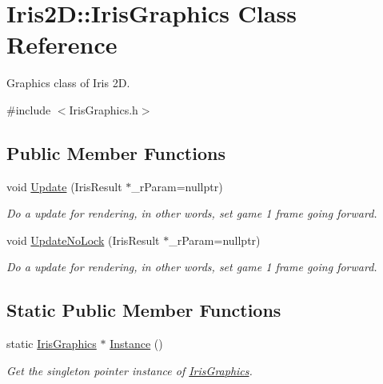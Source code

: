 \hypertarget{class_iris2_d_1_1_iris_graphics}{}\section{Iris2D\+:\+:Iris\+Graphics Class Reference}
\label{class_iris2_d_1_1_iris_graphics}


Graphics class of Iris 2D.  




{\ttfamily \#include $<$Iris\+Graphics.\+h$>$}

\subsection*{Public Member Functions}
\begin{DoxyCompactItemize}
\item 
void \hyperlink{class_iris2_d_1_1_iris_graphics_aa25debfc9a08d7084f48711a6bffdc4d}{Update} (Iris\+Result $\ast$\+\_\+r\+Param=nullptr)
\begin{DoxyCompactList}\small\item\em Do a update for rendering, in other words, set game 1 frame going forward. \end{DoxyCompactList}\item 
void \hyperlink{class_iris2_d_1_1_iris_graphics_adbbca919748bfdd9b84958414debc588}{Update\+No\+Lock} (Iris\+Result $\ast$\+\_\+r\+Param=nullptr)
\begin{DoxyCompactList}\small\item\em Do a update for rendering, in other words, set game 1 frame going forward. \end{DoxyCompactList}\end{DoxyCompactItemize}
\subsection*{Static Public Member Functions}
\begin{DoxyCompactItemize}
\item 
static \hyperlink{class_iris2_d_1_1_iris_graphics}{Iris\+Graphics} $\ast$ \hyperlink{class_iris2_d_1_1_iris_graphics_a25533fd69478336d60c5b1f639802d3a}{Instance} ()
\begin{DoxyCompactList}\small\item\em Get the singleton pointer instance of \hyperlink{class_iris2_d_1_1_iris_graphics}{Iris\+Graphics}. \end{DoxyCompactList}\end{DoxyCompactItemize}


